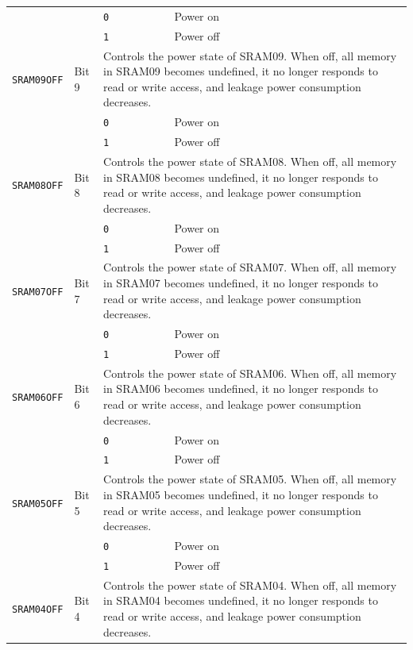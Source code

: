 \begin{tabularx}{\textwidth}{ l l l X }
 & & \texttt{0} & Power on \\
 & & \cellcolor{tablehighlightcolor}\texttt{1} & \cellcolor{tablehighlightcolor}Power off \\
\hline
\texttt{SRAM09OFF} & Bit 9 & \multicolumn{2}{X}{Controls the power state of SRAM09. When off, all memory in SRAM09 becomes undefined, it no longer responds to read or write access, and leakage power consumption decreases.} \\
 & & \texttt{0} & Power on \\
 & & \cellcolor{tablehighlightcolor}\texttt{1} & \cellcolor{tablehighlightcolor}Power off \\
\hline
\texttt{SRAM08OFF} & Bit 8 & \multicolumn{2}{X}{Controls the power state of SRAM08. When off, all memory in SRAM08 becomes undefined, it no longer responds to read or write access, and leakage power consumption decreases.} \\
 & & \texttt{0} & Power on \\
 & & \cellcolor{tablehighlightcolor}\texttt{1} & \cellcolor{tablehighlightcolor}Power off \\
\hline
\texttt{SRAM07OFF} & Bit 7 & \multicolumn{2}{X}{Controls the power state of SRAM07. When off, all memory in SRAM07 becomes undefined, it no longer responds to read or write access, and leakage power consumption decreases.} \\
 & & \texttt{0} & Power on \\
 & & \cellcolor{tablehighlightcolor}\texttt{1} & \cellcolor{tablehighlightcolor}Power off \\
\hline
\texttt{SRAM06OFF} & Bit 6 & \multicolumn{2}{X}{Controls the power state of SRAM06. When off, all memory in SRAM06 becomes undefined, it no longer responds to read or write access, and leakage power consumption decreases.} \\
 & & \texttt{0} & Power on \\
 & & \cellcolor{tablehighlightcolor}\texttt{1} & \cellcolor{tablehighlightcolor}Power off \\
\hline
\texttt{SRAM05OFF} & Bit 5 & \multicolumn{2}{X}{Controls the power state of SRAM05. When off, all memory in SRAM05 becomes undefined, it no longer responds to read or write access, and leakage power consumption decreases.} \\
 & & \texttt{0} & Power on \\
 & & \cellcolor{tablehighlightcolor}\texttt{1} & \cellcolor{tablehighlightcolor}Power off \\
\hline
\texttt{SRAM04OFF} & Bit 4 & \multicolumn{2}{X}{Controls the power state of SRAM04. When off, all memory in SRAM04 becomes undefined, it no longer responds to read or write access, and leakage power consumption decreases.} \\

\end{tabularx}
